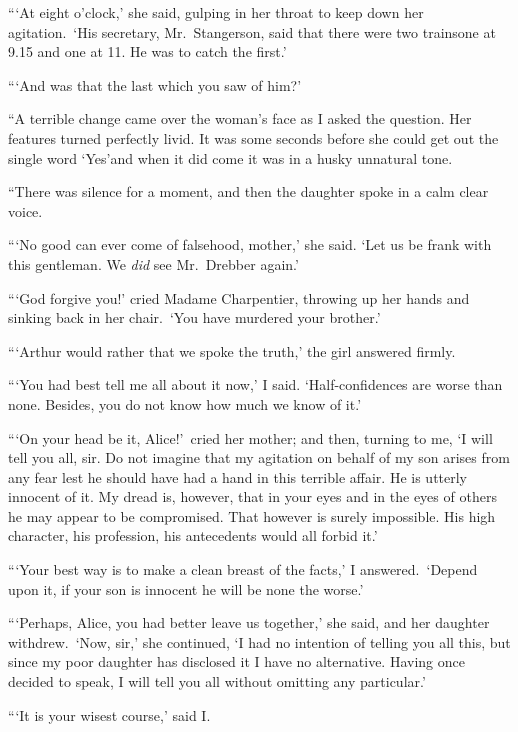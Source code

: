 \documentclass[12pt,english]{book}
\begin{document}
{}```At eight o'clock,' she said, gulping in her throat to keep down
her agitation.\  `His secretary, Mr.\ Stangerson, said that there
were two trains\mdsh{---}one at 9.15 and one at 11. He was to catch
the first.'

{}```And was that the last which you saw of him?'

{}``A terrible change came over the woman's face as I asked the question.
Her features turned perfectly livid. It was some seconds before she
could get out the single word `Yes'\mdsh{---}and when it did come
it was in a husky unnatural tone.

{}``There was silence for a moment, and then the daughter spoke in
a calm clear voice.

{}```No good can ever come of falsehood, mother,' she said. `Let
us be frank with this gentleman. We \textit{did} see Mr.\ Drebber
again.'

{}```God forgive you!' cried Madame Charpentier, throwing up her
hands and sinking back in her chair.\  `You have murdered your brother.'

{}```Arthur would rather that we spoke the truth,' the girl answered
firmly.

{}```You had best tell me all about it now,' I said. `Half-confidences
are worse than none. Besides, you do not know how much we know of
it.'

{}```On your head be it, Alice!'\ cried her mother; and then, turning
to me, `I will tell you all, sir. Do not imagine that my agitation
on behalf of my son arises from any fear lest he should have had a
hand in this terrible affair. He is utterly innocent of it. My dread
is, however, that in your eyes and in the eyes of others he may appear
to be compromised. That however is surely impossible. His high character,
his profession, his antecedents would all forbid it.'

{}```Your best way is to make a clean breast of the facts,' I answered.\ 
`Depend upon it, if your son is innocent he will be none the worse.'

{}```Perhaps, Alice, you had better leave us together,' she said,
and her daughter withdrew.\  `Now, sir,' she continued, `I had no
intention of telling you all this, but since my poor daughter has
disclosed it I have no alternative. Having once decided to speak,
I will tell you all without omitting any particular.'

{}```It is your wisest course,' said I.
\end{document}

